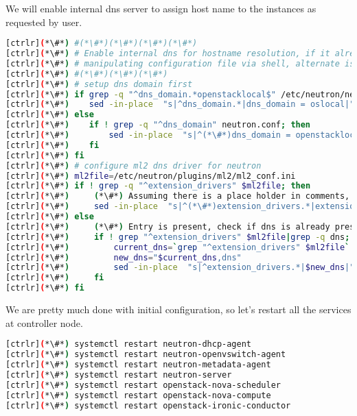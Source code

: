 We will enable internal dns server to assign host name to the instances as requested by user. 


\begin{lstlisting}[language=bash,keywords={}]
[ctrlr](*\#*) #(*\#*)(*\#*)(*\#*)(*\#*)
[ctrlr](*\#*) # Enable internal dns for hostname resolution, if it already not set
[ctrlr](*\#*) # manipulating configuration file via shell, alternate is to use openstack-config (TODO)
[ctrlr](*\#*) #(*\#*)(*\#*)(*\#*)
[ctrlr](*\#*) # setup dns domain first
[ctrlr](*\#*) if grep -q "^dns_domain.*openstacklocal$" /etc/neutron/neutron.conf; then
[ctrlr](*\#*)    sed -in-place  "s|^dns_domain.*|dns_domain = oslocal|" /etc/neutron/neutron.conf
[ctrlr](*\#*) else
[ctrlr](*\#*)    if ! grep -q "^dns_domain" neutron.conf; then
[ctrlr](*\#*)        sed -in-place  "s|^(*\#*)dns_domain = openstacklocal$|dns_domain = oslocal|" /etc/neutron/neutron.conf
[ctrlr](*\#*)    fi
[ctrlr](*\#*) fi
[ctrlr](*\#*) # configure ml2 dns driver for neutron
[ctrlr](*\#*) ml2file=/etc/neutron/plugins/ml2/ml2_conf.ini
[ctrlr](*\#*) if ! grep -q "^extension_drivers" $ml2file; then
[ctrlr](*\#*)     (*\#*) Assuming there is a place holder in comments, replace that string
[ctrlr](*\#*)     sed -in-place  "s|^(*\#*)extension_drivers.*|extension_drivers = port_security,dns|" $ml2file
[ctrlr](*\#*) else
[ctrlr](*\#*)     (*\#*) Entry is present, check if dns is already present, if not then enable
[ctrlr](*\#*)     if ! grep "^extension_drivers" $ml2file|grep -q dns; then
[ctrlr](*\#*)         current_dns=`grep "^extension_drivers" $ml2file`
[ctrlr](*\#*)         new_dns="$current_dns,dns"
[ctrlr](*\#*)         sed -in-place  "s|^extension_drivers.*|$new_dns|" $ml2file
[ctrlr](*\#*)     fi
[ctrlr](*\#*) fi
\end{lstlisting} 

We are pretty much done with initial configuration, so let’s restart all the services at controller node.


\begin{lstlisting}[language=bash,keywords={}]
[ctrlr](*\#*) systemctl restart neutron-dhcp-agent
[ctrlr](*\#*) systemctl restart neutron-openvswitch-agent
[ctrlr](*\#*) systemctl restart neutron-metadata-agent
[ctrlr](*\#*) systemctl restart neutron-server
[ctrlr](*\#*) systemctl restart openstack-nova-scheduler
[ctrlr](*\#*) systemctl restart openstack-nova-compute
[ctrlr](*\#*) systemctl restart openstack-ironic-conductor
\end{lstlisting} 
